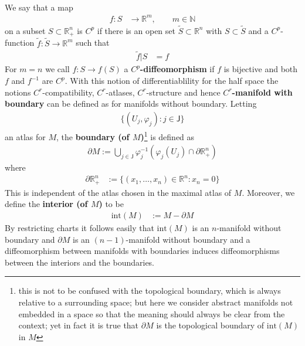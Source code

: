 \\
We say that a map
\begin{align*}
  f
  \colon
  S
  &\to
  \mathbb{R}^{m}
  ,\qquad
  m
  \in
  \mathbb{N}
\end{align*}
on a subset $S \subset \mathbb{R}_{+}^{n}$ is $C^{p}$ if there is an open set $\tilde{S} \subset \mathbb{R}^{n}$ with $S \subset \tilde{S}$ and a $C^{p}$-function $\tilde{f} \colon \tilde{S} \to \mathbb{R}^{m}$ such that
\begin{align*}
  \tilde{f}\vert S
  &=
  f
\end{align*}
For $m=n$ we call $f \colon S \to f(S)$ a \textbf{$C^{p}$-diffeomorphism} if $f$ is bijective and both $f$ and $f^{-1}$ are $C^{p}$. With this notion of differentiablility for the half space the notions $C^{r}$-compatibility, $C^{r}$-atlases, $C^{r}$-structure and hence \textbf{$C^{r}$-manifold with boundary} can be defined as for manifolds without boundary. Letting
\begin{align*}
  \lbrace
    (U_{j},\varphi_{j})
    \colon
    j
    \in
    \mathsf{J}
  \rbrace
\end{align*}
an atlas for $M$, the \textbf{boundary (of $M$)}\footnote{this is not to be confused with the topological boundary, which is always relative to a surrounding space; but here we consider abstract manifolds not embedded in a space so that the meaning should always be clear from the context; yet in fact it is true that $\partial M$ is the topological boundary of $\mathrm{int}(M)$ in $M$} is defined as
\begin{align*}
  \partial M
  :=
  \bigcup_{j \in \mathsf{J}}
  \varphi_{j}^{-1}
  \left(
    \varphi_{j}(U_{j})
    \cap
    \partial \mathbb{R}_{+}^{n}
  \right)
\end{align*}
where
\begin{align*}
  \partial
  \mathbb{R}_{+}^{n}
  &:=
  \lbrace
    (x_{1},\ldots,x_{n})
    \in
    \mathbb{R}^{n}
    \colon
    x_{n}
    =
    0
  \rbrace
\end{align*}
This is independent of the atlas chosen in the maximal atlas of $M$. Moreover, we define the \textbf{interior (of $M$)} to be
\begin{align*}
  \mathrm{int}(M)
  &:=
  M
  -
  \partial M
\end{align*}
By restricting charts it follows easily that $\mathrm{int}(M)$ is an $n$-manifold without boundary and $\partial M$ is an $(n-1)$-manifold without boundary and a diffeomorphism between manifolds with boundaries induces diffeomorphisms between the interiors and the boundaries.
